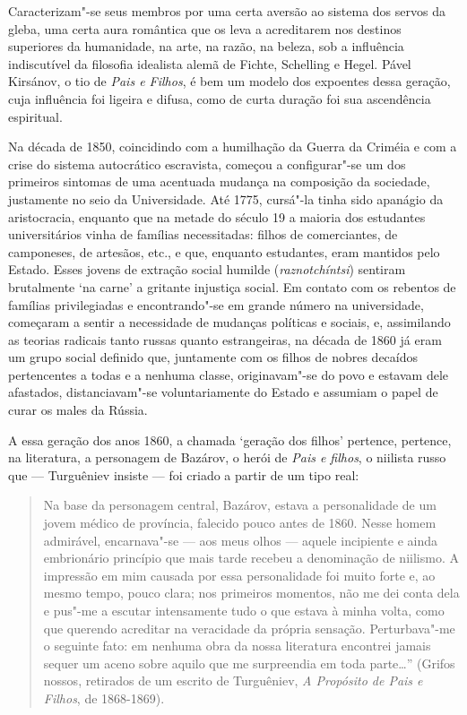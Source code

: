 Caracterizam"-se seus membros por uma certa aversão ao sistema dos servos
da gleba, uma certa aura romântica que os leva a acreditarem nos
destinos superiores da humanidade, na arte, na razão, na beleza, sob a
influência indiscutível da filosofia idealista alemã de Fichte,
Schelling e Hegel. Pável Kirsánov, o tio de \emph{Pais e Filhos}, é bem
um modelo dos expoentes dessa geração, cuja influência foi ligeira e
difusa, como de curta duração foi sua ascendência espiritual.

Na década de 1850, coincidindo com a humilhação da Guerra da Criméia e
com a crise do sistema autocrático escravista, começou a configurar"-se
um dos primeiros sintomas de uma acentuada mudança na composição da
sociedade, justamente no seio da Universidade. Até 1775, cursá"-la tinha
sido apanágio da aristocracia, enquanto que na metade do século 19 a
maioria dos estudantes universitários vinha de famílias necessitadas:
filhos de comerciantes, de camponeses, de artesãos, etc., e que,
enquanto estudantes, eram mantidos pelo Estado. Esses jovens de extração
social humilde (\emph{raznotchíntsi}) sentiram brutalmente `na carne' a
gritante injustiça social. Em contato com os rebentos de famílias
privilegiadas e encontrando"-se em grande número na universidade,
começaram a sentir a necessidade de mudanças políticas e sociais, e,
assimilando as teorias radicais tanto russas quanto estrangeiras, na
década de 1860 já eram um grupo social definido que, juntamente com os
filhos de nobres decaídos pertencentes a todas e a nenhuma classe,
originavam"-se do povo e estavam dele afastados, distanciavam"-se
voluntariamente do Estado e assumiam o papel de curar os males da
Rússia.

A essa geração dos anos 1860, a chamada `geração dos filhos' pertence,
pertence, na literatura, a personagem de Bazárov, o herói de \emph{Pais
e filhos}, o niilista russo que --- Turguêniev insiste --- foi criado a
partir de um tipo real:

\begin{quote}
Na base da personagem central, Bazárov, estava a personalidade de um
jovem médico de província, falecido pouco antes de 1860. Nesse homem
admirável, encarnava"-se --- aos meus olhos --- aquele incipiente e ainda
embrionário princípio que mais tarde recebeu a denominação de niilismo.
A impressão em mim causada por essa personalidade foi muito forte e, ao
mesmo tempo, pouco clara; nos primeiros momentos, não me dei conta dela
e pus"-me a escutar intensamente tudo o que estava à minha volta, como
que querendo acreditar na veracidade da própria sensação. Perturbava"-me
o seguinte fato: em nenhuma obra da nossa literatura encontrei jamais
sequer um aceno sobre aquilo que me surpreendia em toda parte\ldots{}''
(Grifos nossos, retirados de um escrito de Turguêniev, \emph{A Propósito
de Pais e Filhos}, de 1868-1869).
\end{quote}

